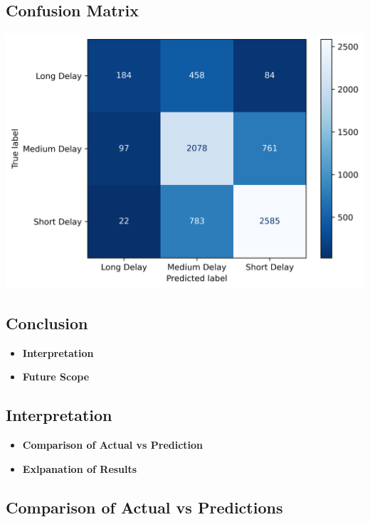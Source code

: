 \documentclass[
  letterpaper,
  DIV=11,
  numbers=noendperiod]{scrartcl}
\providecommand{\tightlist}{%
  \setlength{\itemsep}{0pt}\setlength{\parskip}{0pt}}\usepackage{longtable,booktabs,array}
\begin{document}
\subsection{Confusion Matrix}\label{confusion-matrix}

\begin{center}
\includegraphics{results/images/ConfusionMat.png}
\end{center}

\subsection{Conclusion}\label{conclusion}

\begin{itemize}
\tightlist
\item
  \textbf{Interpretation}
\item
  \textbf{Future Scope}
\end{itemize}

\subsection{Interpretation}\label{interpretation}

\begin{itemize}
\tightlist
\item
  \textbf{Comparison of Actual vs Prediction}
\item
  \textbf{Exlpanation of Results}
\end{itemize}

\subsection{Comparison of Actual vs
Predictions}\label{comparison-of-actual-vs-predictions}
\end{document}
